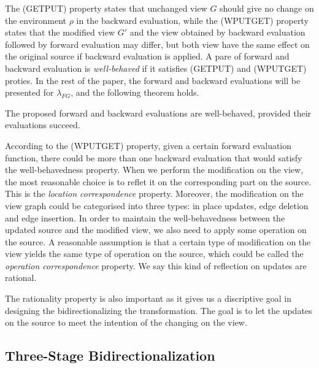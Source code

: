 \documentclass{llncs}
\begin{document}
The (GETPUT) property states that unchanged view $G$ should give no change on the environment $\rho$ in the backward evaluation, while the (WPUTGET) property states that the modified view $G'$ and the view obtained by backward evaluation followed by forward evaluation may differ, but both view have the same effect on the original source if backward evaluation is applied. A pare of forward and backward evaluation is \emph{well-behaved} if it satisfies (GETPUT) and (WPUTGET) proties. In the rest of the paper, the forward and backward evaluations will be presented for $\lambda_{FG}$, and the following theorem holds.

\begin{theorem}\label{th:wellb}
The proposed forward and backward evaluations are well-behaved, provided their evaluations succeed.
\end{theorem}

According to the (WPUTGET) property, given a certain forward evaluation function, there could be more than one backward evaluation that would satisfy the well-behavedness property. When we perform the modification on the view, the most reasonable choice is to reflet it on the corresponding part on the source. This is the \emph{location correspondence} property. Moreover, the modification on the view graph could be categorised into three types: in place updates, edge deletion and edge insertion. In order to maintain the well-behavedness between the updated source and the modified view, we also need to apply some operation on the source. A reasonable assumption is that a certain type of modification on the view yields the same type of operation on the source, which could be called the \emph{operation correspondence} property. We say this kind of reflection on updates are rational.


The rationality property is also important as it gives us a discriptive goal in designing the bidirectionalizing the transformation. The goal is to let the updates on the source to meet the intention of the changing on the view.

\subsection{Three-Stage Bidirectionalization}\label{subsec:3-sta}
\end{document}
